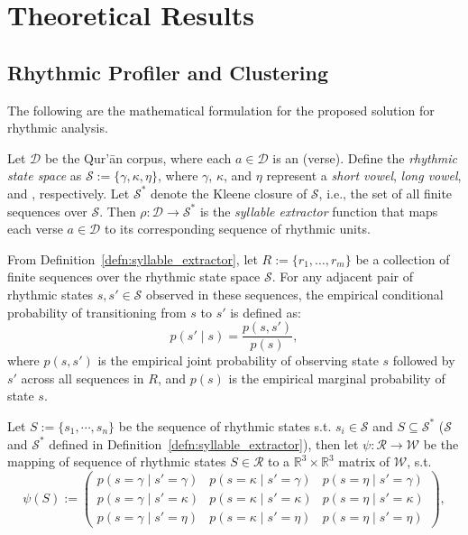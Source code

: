 \chapter{Theoretical Results}
\label{appendix:theoretical_results}
\setcounter{section}{1}
\section{Rhythmic Profiler and Clustering}
The following are the mathematical formulation for the proposed solution for rhythmic analysis.
\begin{defn}\label{defn:syllable_extractor}
    Let $\mathscr{D}$ be the Qur'\=an corpus, where each $a \in \mathscr{D}$ is an   (verse). Define the \textit{rhythmic state space} as $\mathscr{S} := \{\gamma, \kappa, \eta\}$, where $\gamma$, $\kappa$, and $\eta$ represent a \textit{short vowel}, \textit{long vowel}, and  , respectively. Let $\mathscr{S}^*$ denote the Kleene closure of $\mathscr{S}$, i.e., the set of all finite sequences over $\mathscr{S}$. Then $\rho : \mathscr{D} \rightarrow \mathscr{S}^*$ is the \textit{syllable extractor} function that maps each verse $a \in \mathscr{D}$ to its corresponding sequence of rhythmic units.
\end{defn}
\begin{defn}
    From Definition~\ref{defn:syllable_extractor}, let $R := \{r_1, \dots, r_m\}$ be a collection of finite sequences over the rhythmic state space $\mathscr{S}$. For any adjacent pair of rhythmic states $s, s' \in \mathscr{S}$ observed in these sequences, the empirical conditional probability of transitioning from $s$ to $s'$ is defined as:
    \[
        p(s' \mid s) = \frac{p(s, s')}{p(s)},
    \]
    where $p(s, s')$ is the empirical joint probability of observing state $s$ followed by $s'$ across all sequences in $R$, and $p(s)$ is the empirical marginal probability of state $s$.
\end{defn}
\begin{defn}
    Let $S:=\{s_1,\cdots,s_n\}$ be the sequence of rhythmic states s.t. $s_i\in\mathscr{S}$ and $S\subseteq\mathscr{S}^*$ ($\mathscr{S}$ and $\mathscr{S}^*$ defined in Definition~\ref{defn:syllable_extractor}), then let $\psi:\mathscr{R}\rightarrow\mathscr{W}$ be the mapping of sequence of rhythmic states $S\in\mathscr{R}$ to a $\mathbb{R}^{3}\times\mathbb{R}^3$ matrix of $\mathscr{W}$, s.t.
    \begin{equation}
        \psi(S):=\begin{pmatrix}
            p(s=\gamma\mid s'=\gamma) & p(s=\kappa\mid s'=\gamma) & p(s=\eta\mid s'=\gamma) \\
            p(s=\gamma\mid s'=\kappa) & p(s=\kappa\mid s'=\kappa) & p(s=\eta\mid s'=\kappa) \\
            p(s=\gamma\mid s'=\eta) & p(s=\kappa\mid s'=\eta) & p(s=\eta\mid s'=\eta)
            \end{pmatrix},
    \end{equation}
\end{defn}

